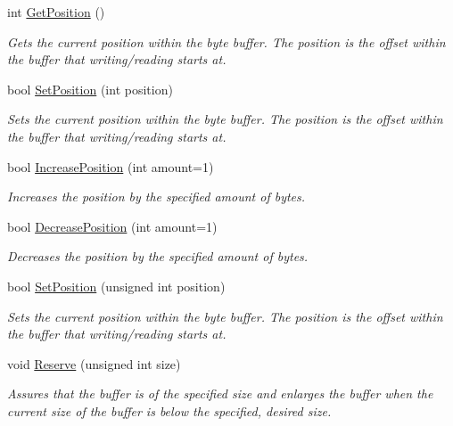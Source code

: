 \begin{DoxyCompactItemize}
int \hyperlink{class_senergy_1_1_byte_buffer_a286e096451b62a14a8d645e1c9da62af}{Get\-Position} ()
\begin{DoxyCompactList}\small\item\em Gets the current position within the byte buffer. The position is the offset within the buffer that writing/reading starts at. \end{DoxyCompactList}\item 
bool \hyperlink{class_senergy_1_1_byte_buffer_a13dd8a2eec8b93ac224f0da614c7f6f8}{Set\-Position} (int position)
\begin{DoxyCompactList}\small\item\em Sets the current position within the byte buffer. The position is the offset within the buffer that writing/reading starts at. \end{DoxyCompactList}\item 
bool \hyperlink{class_senergy_1_1_byte_buffer_ad2ed70d80d2a794d2ce35931819a66da}{Increase\-Position} (int amount=1)
\begin{DoxyCompactList}\small\item\em Increases the position by the specified amount of bytes. \end{DoxyCompactList}\item 
bool \hyperlink{class_senergy_1_1_byte_buffer_a86a02f0e4d2aece53b7867e9a8011e70}{Decrease\-Position} (int amount=1)
\begin{DoxyCompactList}\small\item\em Decreases the position by the specified amount of bytes. \end{DoxyCompactList}\item 
bool \hyperlink{class_senergy_1_1_byte_buffer_a52af5d53098be5cb179f9a05f84f39e2}{Set\-Position} (unsigned int position)
\begin{DoxyCompactList}\small\item\em Sets the current position within the byte buffer. The position is the offset within the buffer that writing/reading starts at. \end{DoxyCompactList}\item 
void \hyperlink{class_senergy_1_1_byte_buffer_a25b96a3aed3e617362dbaee66915c33a}{Reserve} (unsigned int size)
\begin{DoxyCompactList}\small\item\em Assures that the buffer is of the specified size and enlarges the buffer when the current size of the buffer is below the specified, desired size. \end{DoxyCompactList}\item 

\end{DoxyCompactItemize}
